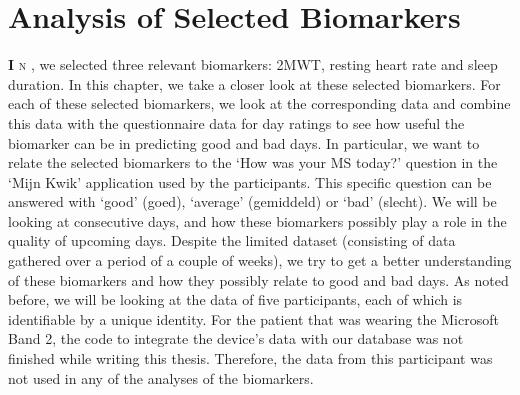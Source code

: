 
\chapter{Analysis of Selected Biomarkers}\label{chapter: Analysis of Selected Biomarkers}
\lettrine[lhang = 0.4, findent=-60pt, lines=7]{\textbf{
		\initfamily \fontsize{40mm}{40mm} \selectfont I
		\normalfont}}{n}
, we selected three relevant biomarkers: 2MWT, resting heart rate and sleep duration.
In this chapter, we take a closer look at these selected biomarkers.
For each of these selected biomarkers, we look at the corresponding data and combine this data with the questionnaire data for day ratings to see how useful the biomarker can be in predicting good and bad days.
In particular, we want to relate the selected biomarkers to the `How was your MS today?' question in the `Mijn Kwik' application used by the participants.
This specific question can be answered with `good' (goed), `average' (gemiddeld) or `bad' (slecht).
We will be looking at consecutive days, and how these biomarkers possibly play a role in the quality of upcoming days.
Despite the limited dataset (consisting of data gathered over a period of a couple of weeks), we try to get a better understanding of these biomarkers and how they possibly relate to good and bad days.
As noted before, we will be looking at the data of five participants, each of which is identifiable by a unique identity. 
For the patient that was wearing the Microsoft Band 2, the code to integrate the device's data with our database was not finished while writing this thesis.
Therefore, the data from this participant was not used in any of the analyses of the biomarkers.




